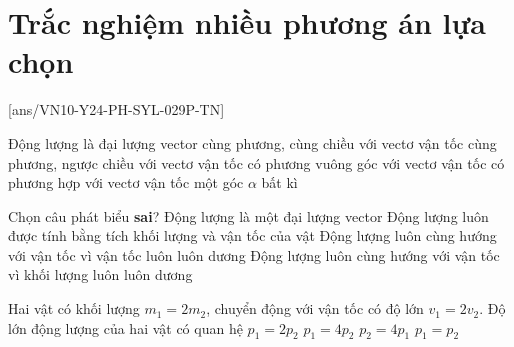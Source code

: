 \let\lesson\undefined
\newcommand{\lesson}{\phantomlesson{Bài 18.}}
\setcounter{section}{2}
\section{Trắc nghiệm nhiều phương án lựa chọn}
\setcounter{ex}{0}
[ans/VN10-Y24-PH-SYL-029P-TN]
\begin{ex}
	Động lượng là đại lượng vector
	\choice
	{\True cùng phương, cùng chiều với vectơ vận tốc}
	{cùng phương, ngược chiều với vectơ vận tốc}
	{có phương vuông góc với vectơ vận tốc}
	{có phương hợp với vectơ vận tốc một góc $\alpha$ bất kì}
\end{ex}
\begin{ex}
		Chọn câu phát biểu \textbf{sai}?
	\choice
	{Động lượng là một đại lượng vector}
	{Động lượng luôn được tính bằng tích khối lượng và vận tốc của vật}
	{\True Động lượng luôn cùng hướng với vận tốc vì vận tốc luôn luôn dương}
	{Động lượng luôn cùng hướng với vận tốc vì khối lượng luôn luôn dương}
	\loigiai{}
\end{ex}
\begin{ex}
	Hai vật có khối lượng $m_1 = 2m_2$, chuyển động với vận tốc có độ lớn $v_1 = 2v_2$. Độ lớn động lượng của hai vật có quan hệ
	\choice
	{$p_1=2p_2$}
	{\True $p_1=4p_2$}
	{$p_2=4p_1$}
	{$p_1=p_2$}
\end{ex}

